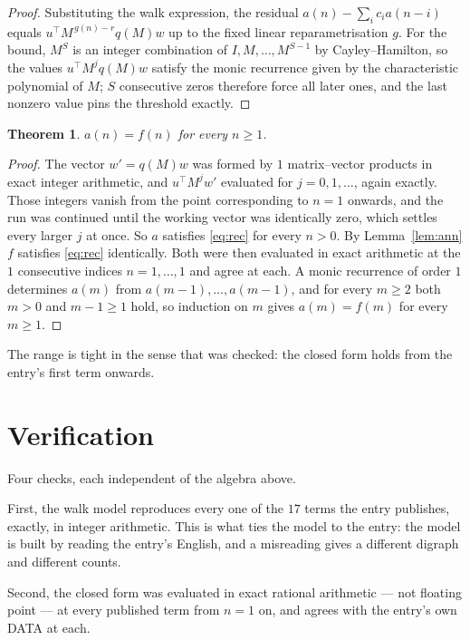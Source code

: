 \documentclass[11pt,a4paper]{article}
\theoremstyle{plain}
\newtheorem{theorem}{Theorem}
\theoremstyle{definition}
\begin{document}
\begin{proof}
Substituting the walk expression, the residual $a(n)-\sum_ic_ia(n-i)$ equals
$u^{\!\top}M^{\,g(n)-r}q(M)w$ up to the fixed linear reparametrisation $g$. For the bound,
$M^{S}$ is an integer combination of $I,M,\dots,M^{S-1}$ by Cayley--Hamilton, so the values
$u^{\!\top}M^{j}q(M)w$ satisfy the monic recurrence given by the characteristic polynomial of
$M$; $S$ consecutive zeros therefore force all later ones, and the last nonzero value pins the
threshold exactly.
\end{proof}

\begin{theorem}
$a(n)=f(n)$ for every $n\ge1$.
\end{theorem}

\begin{proof}
The vector $w'=q(M)w$ was formed by $1$ matrix--vector products in exact integer
arithmetic, and $u^{\!\top}M^{j}w'$ evaluated for $j=0,1,\dots$, again exactly. Those integers
vanish from the point corresponding to $n=1$ onwards, and the run was continued until the
working vector was identically zero, which settles every larger $j$ at once. So $a$ satisfies
\eqref{eq:rec} for every $n>0$. By Lemma~\ref{lem:ann} $f$ satisfies \eqref{eq:rec}
identically. Both were then evaluated in exact arithmetic at the $1$ consecutive indices
$n=1,\dots,1$ and agree at each. A monic recurrence of order $1$
determines $a(m)$ from $a(m-1),\dots,a(m-1)$, and for every $m\ge2$ both
$m>0$ and $m-1\ge1$ hold, so induction on $m$ gives $a(m)=f(m)$ for every
$m\ge1$.
\end{proof}

The range is tight in the sense that was checked: the closed form holds from the entry's first term onwards.

\section{Verification}

Four checks, each independent of the algebra above.

First, the walk model reproduces every one of the $17$ terms the entry publishes,
exactly, in integer arithmetic. This is what ties the model to the entry: the model is built
by reading the entry's English, and a misreading gives a different digraph and different
counts.

Second, the closed form was evaluated in exact rational arithmetic --- not floating point ---
at every published term from $n=1$ on, and agrees with the entry's own DATA at each.
\end{document}
